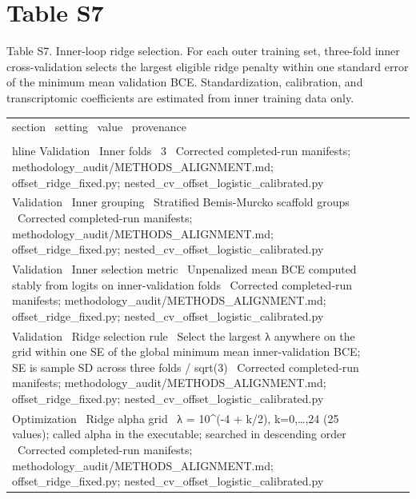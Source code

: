 \documentclass{article}
\begin{document}
\section*{Table S7}
Table S7. Inner-loop ridge selection. For each outer training set, three-fold inner cross-validation selects the largest eligible ridge penalty within one standard error of the minimum mean validation BCE. Standardization, calibration, and transcriptomic coefficients are estimated from inner training data only.
\begin{tabular}{llll}
section \ setting \ value \ provenance \\ \\hline
Validation \ Inner folds \ 3 \ Corrected completed-run manifests; methodology_audit/METHODS_ALIGNMENT.md; offset_ridge_fixed.py; nested_cv_offset_logistic_calibrated.py \\
Validation \ Inner grouping \ Stratified Bemis-Murcko scaffold groups \ Corrected completed-run manifests; methodology_audit/METHODS_ALIGNMENT.md; offset_ridge_fixed.py; nested_cv_offset_logistic_calibrated.py \\
Validation \ Inner selection metric \ Unpenalized mean BCE computed stably from logits on inner-validation folds \ Corrected completed-run manifests; methodology_audit/METHODS_ALIGNMENT.md; offset_ridge_fixed.py; nested_cv_offset_logistic_calibrated.py \\
Validation \ Ridge selection rule \ Select the largest λ anywhere on the grid within one SE of the global minimum mean inner-validation BCE; SE is sample SD across three folds / sqrt(3) \ Corrected completed-run manifests; methodology_audit/METHODS_ALIGNMENT.md; offset_ridge_fixed.py; nested_cv_offset_logistic_calibrated.py \\
Optimization \ Ridge alpha grid \ λ = 10^(-4 + k/2), k=0,…,24 (25 values); called alpha in the executable; searched in descending order \ Corrected completed-run manifests; methodology_audit/METHODS_ALIGNMENT.md; offset_ridge_fixed.py; nested_cv_offset_logistic_calibrated.py \\
\end{tabular}
\end{document}
